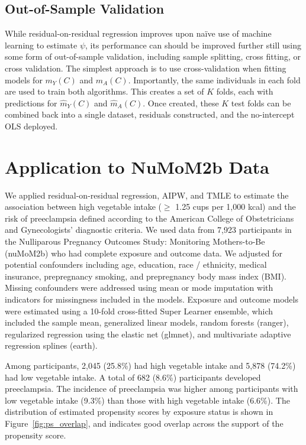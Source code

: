 \documentclass[12pt]{article}
\begin{document}
\subsection{Out-of-Sample Validation}

While residual-on-residual regression improves upon na\"{i}ve use of machine learning to estimate $\psi$, its performance can should be improved further still using some form of out-of-sample validation,\cite{Zivich2022} including sample splitting, cross fitting, or cross validation. The simplest approach is to use cross-validation when fitting models for $m_Y(C)$ and $m_A(C)$. Importantly, the same individuals in each fold are used to train both algorithms. This creates a set of $K$ folds, each with predictions for $\hat{m}_Y(C)$ and $\hat{m}_A(C)$. Once created, these $K$ test folds can be combined back into a single dataset, residuals constructed, and the no-intercept OLS deployed.

\section{Application to NuMoM2b Data}

We applied residual-on-residual regression, AIPW, and TMLE to estimate the association between high vegetable intake ($\geq$ 1.25 cups per 1{,}000 kcal) and the risk of preeclampsia defined according to the American College of Obstetricians and Gynecologists' diagnostic criteria. We used data from 7{,}923 participants in the Nulliparous Pregnancy Outcomes Study: Monitoring Mothers-to-Be (nuMoM2b) who had complete exposure and outcome data. We adjusted for potential confounders including age, education, race / ethnicity, medical insurance, prepregnancy smoking, and prepregnancy body mass index (BMI). Missing confounders were addressed using mean or mode imputation with indicators for missingness included in the models. Exposure and outcome models were estimated using a 10-fold cross-fitted Super Learner ensemble, which included the sample mean, generalized linear models, random forests (ranger), regularized regression using the elastic net (glmnet), and multivariate adaptive regression splines (earth).

Among participants, 2{,}045 (25.8\%) had high vegetable intake and 5{,}878 (74.2\%) had low vegetable intake. A total of 682 (8.6\%) participants developed preeclampsia. The incidence of preeclampsia was higher among participants with low vegetable intake (9.3\%) than those with high vegetable intake (6.6\%). The distribution of estimated propensity scores by exposure status is shown in Figure~\ref{fig:ps_overlap}, and indicates good overlap across the support of the propensity score. 
\end{document}
